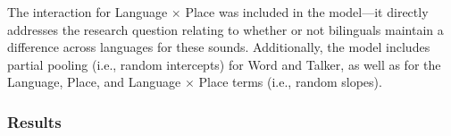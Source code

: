 The interaction for Language $\times$ Place was included in the model---it directly addresses the research question relating to whether or not bilinguals maintain a difference across languages for these sounds. Additionally, the model includes partial pooling (i.e., random intercepts) for Word and Talker, as well as for the Language, Place, and Language $\times$ Place terms (i.e., random slopes). 

\subsubsection{Results}\label{ch4:sec:results}











